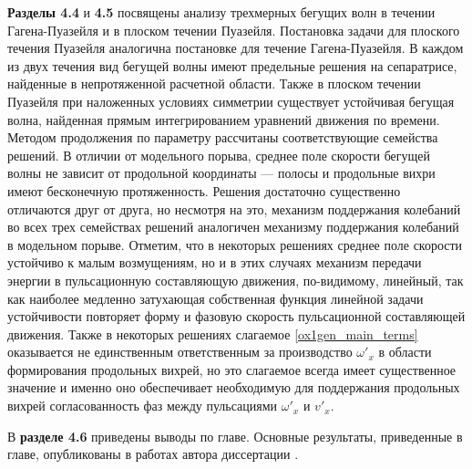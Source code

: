 \textbf{Разделы 4.4} и \textbf{4.5} посвящены анализу трехмерных бегущих волн в течении Гагена-Пуазейля и в плоском течении Пуазейля. Постановка задачи для плоского течения Пуазейля аналогична постановке для течение Гагена-Пуазейля. В каждом из двух течения вид бегущей волны имеют предельные решения на сепаратрисе, найденные в непротяженной расчетной области. Также в плоском течении Пуазейля при наложенных условиях симметрии существует устойчивая бегущая волна, найденная прямым интегрированием уравнений движения по времени. Методом продолжения по параметру рассчитаны соответствующие семейства решений. В отличии от модельного порыва, среднее поле скорости бегущей волны не зависит от продольной координаты --- полосы и продольные вихри имеют бесконечную протяженность. Решения достаточно существенно отличаются друг от друга, но несмотря на это, механизм поддержания колебаний во всех трех семействах решений аналогичен механизму поддержания колебаний в модельном порыве. Отметим, что в некоторых решениях среднее поле скорости устойчиво к малым возмущениям, но и в этих случаях механизм передачи энергии в пульсационную составляющую движения, по-видимому, линейный, так как наиболее медленно затухающая собственная функция линейной задачи устойчивости повторяет форму и фазовую скорость пульсационной составляющей движения. Также в некоторых решениях слагаемое \eqref{ox1gen_main_terms} оказывается не единственным ответственным за производство $\omega'_x$ в области формирования продольных вихрей, но это слагаемое всегда имеет существенное значение и именно оно обеспечивает необходимую для поддержания продольных вихрей согласованность фаз между пульсациями $\omega'_x$ и $v'_x$. 

В \textbf{разделе 4.6} приведены выводы по главе. Основные результаты, приведенные в главе, опубликованы в работах автора диссертации \cite{Vest18, KMU2016}. 


